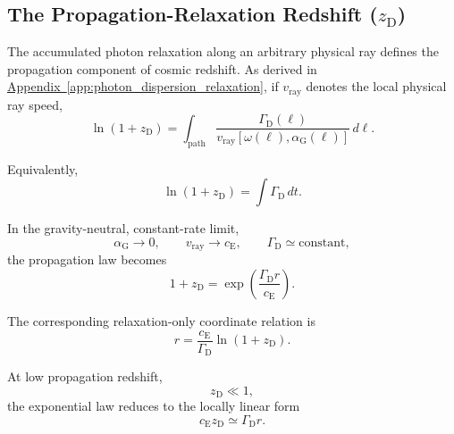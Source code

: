 \subsection{The Propagation-Relaxation Redshift ($z_{\mathrm D}$)}

The accumulated photon relaxation along an arbitrary physical ray defines the propagation component of cosmic redshift. As derived in
\hyperref[app:photon_dispersion_relaxation]{Appendix~\ref*{app:photon_dispersion_relaxation}},
if $v_{\mathrm{ray}}$ denotes the local physical ray speed,
\begin{equation}
    \ln(1+z_{\mathrm D})
    =
    \int_{\mathrm{path}}
    \frac{
        \Gamma_{\mathrm D}(\ell)
    }{
        v_{\mathrm{ray}}
        \!\left[
            \omega(\ell),
            \alpha_{\mathrm G}(\ell)
        \right]
    }
    \,d\ell.
\end{equation}

Equivalently,
\begin{equation}
    \ln(1+z_{\mathrm D})
    =
    \int
    \Gamma_{\mathrm D}
    \,dt.
\end{equation}

In the gravity-neutral, constant-rate limit,
\begin{equation}
    \alpha_{\mathrm G}
    \rightarrow
    0,
    \qquad
    v_{\mathrm{ray}}
    \rightarrow
    c_{\mathrm E},
    \qquad
    \Gamma_{\mathrm D}
    \simeq
    \mathrm{constant},
\end{equation}
the propagation law becomes
\begin{equation}
    1+z_{\mathrm D}
    =
    \exp\!\left(
        \frac{
            \Gamma_{\mathrm D}r
        }{
            c_{\mathrm E}
        }
    \right).
\end{equation}

The corresponding relaxation-only coordinate relation is
\begin{equation}
    r
    =
    \frac{
        c_{\mathrm E}
    }{
        \Gamma_{\mathrm D}
    }
    \ln(1+z_{\mathrm D}).
\end{equation}

At low propagation redshift,
\begin{equation}
    z_{\mathrm D}
    \ll
    1,
\end{equation}
the exponential law reduces to the locally linear form
\begin{equation}
    c_{\mathrm E}
    z_{\mathrm D}
    \simeq
    \Gamma_{\mathrm D}r.
\end{equation}


